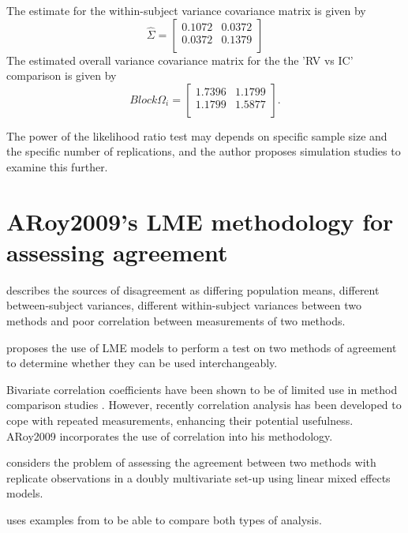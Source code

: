 \documentclass[12pt, a4paper]{report}
\theoremstyle{plain}
\theoremstyle{definition}
\theoremstyle{remark}
\begin{document}
	The estimate for the within-subject variance covariance matrix is
	given by
	\begin{equation}
	\hat{\Sigma}= \left[ \begin{array}{cc}
	0.1072 & 0.0372  \\
	0.0372 & 0.1379  \\
	\end{array}\right]
	\end{equation}
	The estimated overall variance covariance matrix for the the 'RV
	vs IC' comparison is given by
	\begin{equation}
	Block \Omega_{i}= \left[ \begin{array}{cc}
	1.7396 & 1.1799  \\
	1.1799 & 1.5877  \\
	\end{array} \right].
	\end{equation}
	
	The power of the
	likelihood ratio test may depends on specific sample size and the
	specific number of  replications, and the author proposes
	simulation studies to examine this further.
	
	\section{ARoy2009's LME methodology for assessing agreement}
	
	\citet{Barnhart}  describes the sources of disagreement as
	differing population means, different between-subject variances,
	different within-subject variances between two methods and poor
	correlation between measurements of two methods.
	
	
	\citet{AARoy20092009}proposes the use of LME models to perform a test
	on two methods of agreement to determine whether they can be used
	interchangeably.
	
	Bivariate correlation coefficients have been shown to be of
	limited use in method comparison studies \citep{BA86}. However,
	recently correlation analysis has been developed to cope with
	repeated measurements, enhancing their potential usefulness. ARoy2009
	incorporates the use of correlation into his methodology.
	
	
	\citet{AARoy20092009} considers the problem of assessing the agreement
	between two methods with replicate observations in a doubly
	multivariate set-up using linear mixed effects models.
	
	
	\citet{AARoy20092009} uses examples from \citet{BA86} to be able to
	compare both types of analysis.
	
\end{document}
